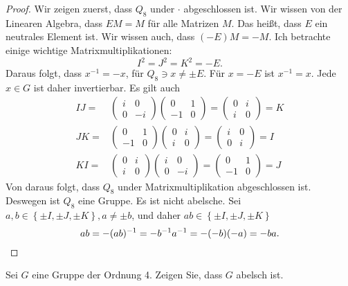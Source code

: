 \begin{proof}
	Wir zeigen zuerst, dass $Q_8$ under $\cdot$ abgeschlossen ist. Wir wissen von der Linearen Algebra, dass $EM=M$ f\"{u}r alle Matrizen $M$. Das heißt, dass $E$ ein neutrales Element ist. Wir wissen auch, dass $(-E)M=-M$. Ich betrachte einige wichtige Matrixmultiplikationen:
	\[
	I^2=J^2=K^2=-E
	.\]
	Daraus folgt, dass $x^{-1}=-x$, f\"{u}r $Q_8\ni x \neq \pm E$. F\"{u}r $x=-E$ ist $x^{-1}=x$. Jede $x\in G$ ist daher invertierbar.
	Es gilt auch
	\begin{align*}
		IJ=&\begin{pmatrix} i & 0 \\ 0 & -i \end{pmatrix} \begin{pmatrix} 0 & 1 \\ -1 & 0 \end{pmatrix} =\begin{pmatrix} 0 & i \\ i & 0 \end{pmatrix}=K\\
		JK=&\begin{pmatrix} 0 & 1 \\ -1 & 0 \end{pmatrix} \begin{pmatrix} 0 & i \\ i & 0 \end{pmatrix} =\begin{pmatrix} i & 0 \\ 0 & i \end{pmatrix}=I\\
		KI=&\begin{pmatrix} 0 & i\\i & 0 \end{pmatrix} \begin{pmatrix} i & 0 \\ 0 & -i \end{pmatrix}=\begin{pmatrix} 0 & 1 \\ -1 & 0 \end{pmatrix} =J
	\end{align*}
	Von daraus folgt, dass $Q_8$ under Matrixmultiplikation abgeschlossen ist. Deswegen ist $Q_8$ eine Gruppe. Es ist nicht abelsche. Sei $a,b\in \left\{ \pm I, \pm J, \pm K \right\}, a\neq \pm b$, und daher $ab\in \left\{ \pm I, \pm J, \pm K \right\} $ 
	\[
	ab=-(ab)^{-1}=-b^{-1}a^{-1}=-(-b)(-a)=-ba
	.\qedhere\] 
\end{proof}
\begin{Problem}
	Sei $G$ eine Gruppe der Ordnung 4. Zeigen Sie, dass $G$ abelsch ist.
\end{Problem}

